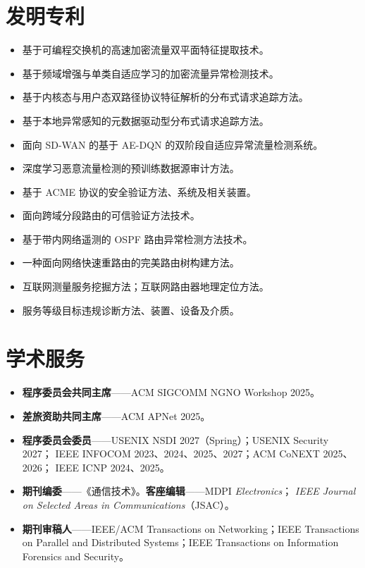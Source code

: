 \documentclass[11pt]{article}
\begin{document}
\section{发明专利}
\begin{itemize}
  \item 基于可编程交换机的高速加密流量双平面特征提取技术。
  \item 基于频域增强与单类自适应学习的加密流量异常检测技术。
  \item 基于内核态与用户态双路径协议特征解析的分布式请求追踪方法。
  \item 基于本地异常感知的元数据驱动型分布式请求追踪方法。
  \item 面向 SD-WAN 的基于 AE-DQN 的双阶段自适应异常流量检测系统。
  \item 深度学习恶意流量检测的预训练数据源审计方法。
  \item 基于 ACME 协议的安全验证方法、系统及相关装置。
  \item 面向跨域分段路由的可信验证方法技术。
  \item 基于带内网络遥测的 OSPF 路由异常检测方法技术。
  \item 一种面向网络快速重路由的完美路由树构建方法。
  \item 互联网测量服务挖掘方法；互联网路由器地理定位方法。
  \item 服务等级目标违规诊断方法、装置、设备及介质。
\end{itemize}

\section{学术服务}
\begin{itemize}
  \item \textbf{程序委员会共同主席}——ACM SIGCOMM NGNO Workshop 2025。
  \item \textbf{差旅资助共同主席}——ACM APNet 2025。
  \item \textbf{程序委员会委员}——USENIX NSDI 2027（Spring）；USENIX Security 2027；
        IEEE INFOCOM 2023、2024、2025、2027；ACM CoNEXT 2025、2026；
        IEEE ICNP 2024、2025。
  \item \textbf{期刊编委}——《通信技术》。\textbf{客座编辑}——MDPI \emph{Electronics}；
        \emph{IEEE Journal on Selected Areas in Communications}（JSAC）。
  \item \textbf{期刊审稿人}——IEEE/ACM Transactions on Networking；IEEE Transactions on
        Parallel and Distributed Systems；IEEE Transactions on Information Forensics
        and Security。
\end{itemize}
\end{document}
